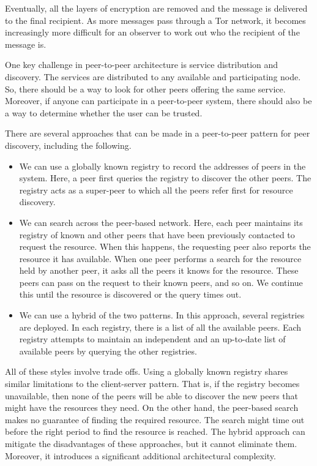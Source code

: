 \documentclass[a4paper, openany]{memoir}
\begin{document}
Eventually, all the layers of encryption are removed and the message is delivered to the final recipient. As more messages pass through a Tor network, it becomes increasingly more difficult for an observer to work out who the recipient of the message is.

One key challenge in peer-to-peer architecture is service distribution and discovery. The services are distributed to any available and participating node. So, there should be a way to look for other peers offering the same service. Moreover, if anyone can participate in a peer-to-peer system, there should also be a way to determine whether the user can be trusted.

There are several approaches that can be made in a peer-to-peer pattern for peer discovery, including the following.
\begin{itemize}
    \item We can use a globally known registry to record the addresses of peers in the system. Here, a peer first queries the registry to discover the other peers. The registry acts as a super-peer to which all the peers refer first for resource discovery.
    \item We can search across the peer-based network. Here, each peer maintains its registry of known and other peers that have been previously contacted to request the resource. When this happens, the requesting peer also reports the resource it has available. When one peer performs a search for the resource held by another peer, it asks all the peers it knows for the resource. These peers can pass on the request to their known peers, and so on. We continue this until the resource is discovered or the query times out.
    \item We can use a hybrid of the two patterns. In this approach, several registries are deployed. In each registry, there is a list of all the available peers. Each registry attempts to maintain an independent and an up-to-date list of available peers by querying the other registries.
\end{itemize}

All of these styles involve trade offs. Using a globally known registry shares similar limitations to the client-server pattern. That is, if the registry becomes unavailable, then none of the peers will be able to discover the new peers that might have the resources they need. On the other hand, the peer-based search makes no guarantee of finding the required resource. The search might time out before the right period to find the resource is reached. The hybrid approach can mitigate the disadvantages of these approaches, but it cannot eliminate them. Moreover, it introduces a significant additional architectural complexity.
\end{document}
